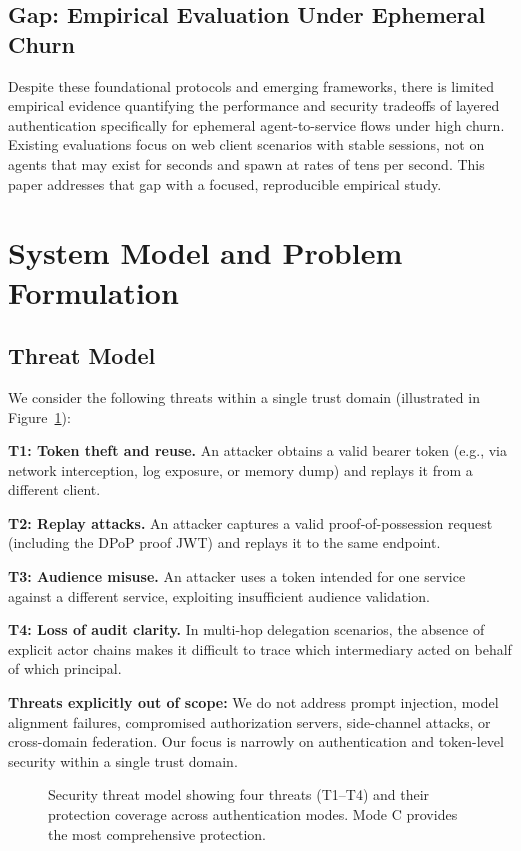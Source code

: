 \documentclass[conference,10pt]{IEEEtran}
\begin{document}
\subsection{Gap: Empirical Evaluation Under Ephemeral Churn}

Despite these foundational protocols and emerging frameworks, there is limited empirical evidence quantifying the performance and security tradeoffs of layered authentication specifically for ephemeral agent-to-service flows under high churn. Existing evaluations focus on web client scenarios with stable sessions, not on agents that may exist for seconds and spawn at rates of tens per second. This paper addresses that gap with a focused, reproducible empirical study.

\section{System Model and Problem Formulation}

\subsection{Threat Model}

We consider the following threats within a single trust domain (illustrated in Figure~\ref{fig:threats}):

\textbf{T1: Token theft and reuse.} An attacker obtains a valid bearer token (e.g., via network interception, log exposure, or memory dump) and replays it from a different client.

\textbf{T2: Replay attacks.} An attacker captures a valid proof-of-possession request (including the DPoP proof JWT) and replays it to the same endpoint.

\textbf{T3: Audience misuse.} An attacker uses a token intended for one service against a different service, exploiting insufficient audience validation.

\textbf{T4: Loss of audit clarity.} In multi-hop delegation scenarios, the absence of explicit actor chains makes it difficult to trace which intermediary acted on behalf of which principal.

\textbf{Threats explicitly out of scope:} We do not address prompt injection, model alignment failures, compromised authorization servers, side-channel attacks, or cross-domain federation. Our focus is narrowly on authentication and token-level security within a single trust domain.

\begin{figure}[t]
\centering

\caption{Security threat model showing four threats (T1--T4) and their protection coverage across authentication modes. Mode C provides the most comprehensive protection.}
\label{fig:threats}
\end{figure}
\end{document}
